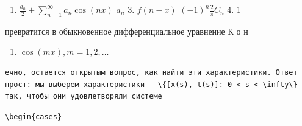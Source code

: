\documentclass[
  ukrainian,
]{article}
\providecommand{\tightlist}{%
  \setlength{\itemsep}{0pt}\setlength{\parskip}{0pt}}
\begin{document}
\begin{enumerate}
\def\labelenumi{\arabic{enumi}.}
\setcounter{enumi}{1}
\tightlist
\item
  \(\frac{a_{0}}{2} + \sum_{n=1}^{\infty} a_{n} \cos(nx)\) \(a_{n}\) 3.
  \(f(n-x)\) \((-1)^{n} \frac{2}{\pi} C_{n}\) 4. 1
\end{enumerate}

превратится в обыкновенное дифференциальное уравнение К о н

\begin{enumerate}
\def\labelenumi{\arabic{enumi}.}
\setcounter{enumi}{4}
\tightlist
\item
  \(\cos(mx), m=1, 2, \dots\)
\end{enumerate}

\begin{verbatim}
ечно, остается открытым вопрос, как найти эти характеристики. Ответ прост: мы выберем характеристики   \{[x(s), t(s)]: 0 < s < \infty\}   так, чтобы они удовлетворяли системе
\end{verbatim}

\begin{verbatim}
\begin{cases}
\end{verbatim}
\end{document}
